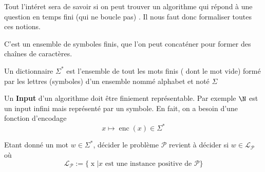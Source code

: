 \begin{centering}


\end{centering}

Tout l'intéret sera de savoir si on peut trouver un algorithme qui répond à une question en temps fini (qui ne boucle pas) .
Il nous faut donc formaliser toutes ces notions. 

\begin{definition}[mot]
    C'est un ensemble de symboles finis, que l'on peut concaténer pour former des chaînes de caractères.
\end{definition}

\begin{definition}
    Un dictionnaire $\Sigma^*$ est l'ensemble de tout les mots finis ( dont le mot vide) formé par les lettres (symboles) d'un ensemble nommé alphabet et noté $\Sigma$
\end{definition}

Un \textbf{Input} d'un algorithme doit être finiement représentable. Par exemple $\N$ est un input infini mais représenté par un symbole.
En fait, on a besoin d'une fonction d'encodage 
$$
x\mapsto \operatorname{enc}(x)\in \Sigma^*
$$

Etant donné un mot $w\in \Sigma^*$, décider le problème $\mathcal{P}$
revient à décider si $w\in \mathcal{L}_\mathcal{P}$ où
$$
\mathcal{L}_\mathcal{P} := \{\operatorname{x} | x \text{ est une instance positive de }\mathcal{P}\}
$$

